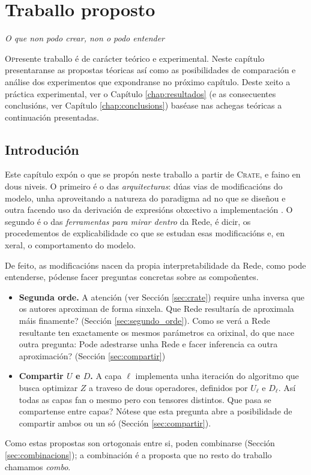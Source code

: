 \chapter{Traballo proposto}
\label{chap:traballo}

\hfill\emph{O que non podo crear, non o podo entender} \cite{feynman}

\lettrine{O} presente traballo é de carácter teórico e experimental. Neste capítulo presentaranse as propostas téoricas así como as posibilidades de comparación e análise dos experimentos que expondranse no próximo capítulo. Deste xeito a práctica experimental, ver o Capítulo \ref{chap:resultados} (e as consecuentes conclusións, ver Capítulo \ref{chap:conclusions}) baséase nas achegas teóricas a continuación presentadas.

\section{Introdución}

Este capítulo expón o que se propón neste traballo a partir de \textsc{Crate}, e faino en dous niveis. O primeiro é o das \emph{arquitecturas}: dúas vias de modificacións do modelo, unha aproveitando a natureza do paradigma \acrshort{ad} no que se diseñou e outra facendo uso da derivación de expresións obxectivo a implementación . O segundo é o das \emph{ferramentas para mirar dentro} da Rede, é dicir, os procedementos de \gls{explicabilidade} co que se estudan esas modificacións e, en xeral, o comportamento do modelo.

De feito, as modificacións nacen da propia \gls{interpretabilidade} da Rede, como pode entenderse, pódense facer preguntas concretas sobre as compoñentes.

\begin{itemize}
				\item \textbf{Segunda orde.} A atención (ver Sección \ref{sec:crate}) require unha inversa que os autores aproximan de forma sinxela. Que Rede resultaría de aproximala máis finamente? (Sección \ref{sec:segundo_orde}). Como se verá a Rede resultante ten exactamente os mesmos parámetros ca orixinal, do que nace outra pregunta: Pode adestrarse unha Rede e facer inferencia ca outra aproximación? (Sección \ref{sec:compartir})
  \item \textbf{Compartir $U$ e $D$.} A capa $\ell$ implementa unha iteración do algoritmo que busca optimizar $Z$ a traveso de dous operadores, definidos por $U_\ell$ e $D_\ell$. Así todas as capas fan o mesmo pero con tensores distintos. Que pasa se compartense entre capas? Nótese que esta pregunta abre a posibilidade de compartir ambos ou un só (Sección \ref{sec:compartir}).
\end{itemize}
Como estas propostas son ortogonais entre si, poden combinarse (Sección \ref{sec:combinacions}); a combinación é a proposta que no resto do traballo chamamos \emph{combo}.

